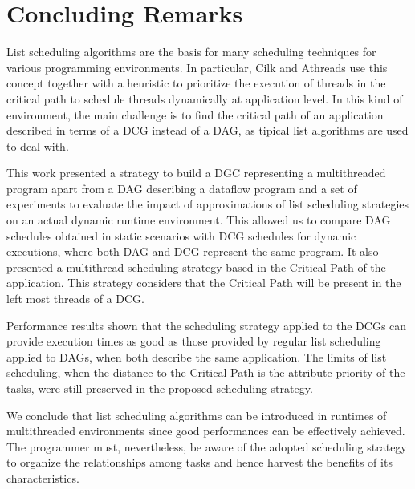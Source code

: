 \documentclass[twocolumn]{svjour3}
\begin{document}
\section{Concluding Remarks}\label{sec:conclusion}

List scheduling algorithms are the basis for many scheduling techniques for various programming environments. In particular, Cilk and Athreads use this concept together with a heuristic to prioritize the execution of threads in the critical path to schedule threads dynamically at application level. In this kind of environment, the main challenge is to find the critical path of an application described in terms of a DCG instead of a DAG, as tipical list algorithms are used to deal with.

This work presented a strategy to build a DGC representing a multithreaded program apart from a DAG describing a dataflow program and a set of experiments to evaluate the impact of approximations of list scheduling strategies on an actual dynamic runtime environment. This allowed us to compare DAG schedules obtained in static scenarios with DCG schedules for dynamic executions, where both DAG and DCG represent the same program. It also presented a multithread scheduling strategy based in the Critical Path of the application. This strategy considers that the Critical Path will be present in the left most threads of a DCG. 

Performance results shown that the scheduling strategy applied to the DCGs can provide execution times as good as those provided by regular list scheduling applied to DAGs, when both describe the same application. The limits of list scheduling, when the distance to the Critical Path is the attribute priority of the tasks, were still preserved in the proposed scheduling strategy.

We conclude that list scheduling algorithms can be introduced in runtimes of multithreaded environments since good performances can be effectively achieved. The programmer must, nevertheless, be aware of the adopted scheduling strategy to organize the relationships among tasks and hence harvest the benefits of its characteristics.



\end{document}
